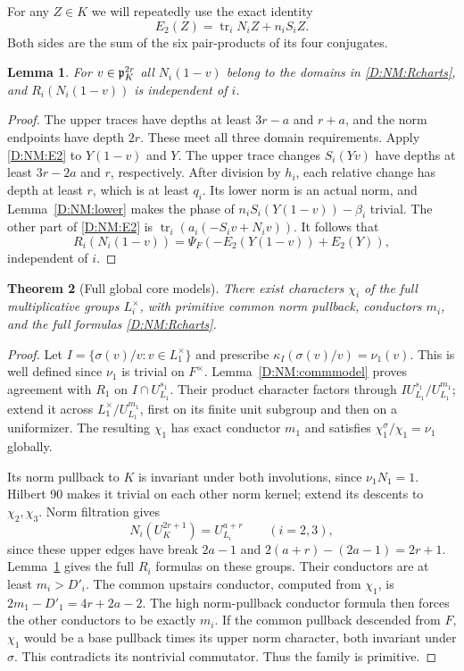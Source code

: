 \documentclass[11pt]{amsart}
\newtheorem{theorem}{Theorem}[section]
\newtheorem{lemma}[theorem]{Lemma}
\theoremstyle{definition}
\theoremstyle{remark}
\begin{document}
For any $Z\in K$ we will repeatedly use the exact identity
\begin{equation}\label{D:NM:E2}
 E_2(Z)=\operatorname{tr}_i N_iZ+n_iS_iZ.
\end{equation}
Both sides are the sum of the six pair-products of its four conjugates.
\begin{lemma}\label{D:NM:compat}
For $v\in\mathfrak p_K^{2r}$ all $N_i(1-v)$ belong to the domains in
\eqref{D:NM:Rcharts}, and $R_i(N_i(1-v))$ is independent of $i$.
\end{lemma}
\begin{proof}
The upper traces have depths at least $3r-a$ and $r+a$, and the norm
endpoints have depth $2r$. These meet all three domain requirements.
Apply \eqref{D:NM:E2} to $Y(1-v)$ and $Y$. The upper trace changes
$S_i(Yv)$ have depths at least $3r-2a$ and $r$, respectively.
After division by $h_i$, each relative change has depth at least $r$,
which is at least $q_i$. Its lower norm is an actual norm, and
Lemma~\ref{D:NM:lower} makes the phase of
$n_iS_i(Y(1-v))-\beta_i$ trivial. The other part of \eqref{D:NM:E2} is
$\operatorname{tr}_i(a_i(-S_iv+N_iv))$.
It follows that
\[
 R_i(N_i(1-v))=\Psi_F(-E_2(Y(1-v))+E_2(Y)),
\]
independent of $i$.
\end{proof}

\begin{theorem}[Full global core models]\label{D:NM:core-exists}
There exist characters $\chi_i$ of the full multiplicative groups
$L_i^\times$, with primitive common norm pullback, conductors $m_i$,
and the full formulas \eqref{D:NM:Rcharts}.
\end{theorem}
\begin{proof}
Let $I=\{\sigma(v)/v:v\in L_1^\times\}$ and prescribe
$\kappa_I(\sigma(v)/v)=\nu_1(v)$. This is well defined since
$\nu_1$ is trivial on $F^\times$. Lemma~\ref{D:NM:commmodel} proves agreement
with $R_1$ on $I\cap U_{L_1}^{s_1}$. Their product character factors
through $I U_{L_1}^{s_1}/U_{L_1}^{m_1}$; extend it across
$L_1^\times/U_{L_1}^{m_1}$, first on its finite unit subgroup and then
on a uniformizer. The resulting $\chi_1$ has exact conductor $m_1$
and satisfies $\chi_1^\sigma/\chi_1=\nu_1$ globally.

Its norm pullback to $K$ is invariant under both involutions, since
$\nu_1N_1=1$. Hilbert 90 makes it trivial on each other norm kernel;
extend its descents to $\chi_2,\chi_3$. Norm filtration gives
\[
 N_i(U_K^{2r+1})=U_{L_i}^{a+r}\qquad(i=2,3),
\]
since these upper edges have break $2a-1$ and
$2(a+r)-(2a-1)=2r+1$. Lemma~\ref{D:NM:compat} gives the full $R_i$ formulas
on these groups. Their conductors are at least $m_i>D'_i$.
The common upstairs conductor, computed from $\chi_1$, is
$2m_1-D'_1=4r+2a-2$. The high norm-pullback conductor formula then
forces the other conductors to be exactly $m_i$.
If the common pullback descended from $F$, $\chi_1$ would be a base
pullback times its upper norm character, both invariant under $\sigma$.
This contradicts its nontrivial commutator. Thus the family is primitive.
\end{proof}
\end{document}
